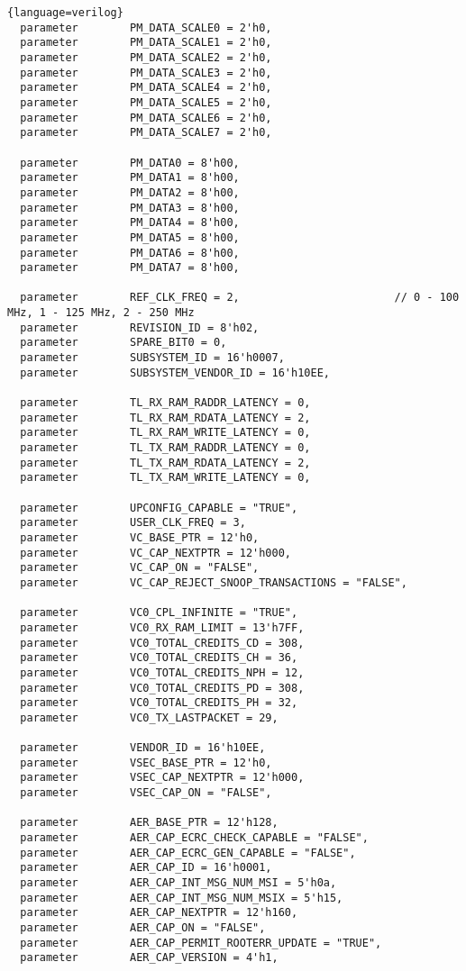\begin{lstlisting}{language=verilog}
  parameter        PM_DATA_SCALE0 = 2'h0,
  parameter        PM_DATA_SCALE1 = 2'h0,
  parameter        PM_DATA_SCALE2 = 2'h0,
  parameter        PM_DATA_SCALE3 = 2'h0,
  parameter        PM_DATA_SCALE4 = 2'h0,
  parameter        PM_DATA_SCALE5 = 2'h0,
  parameter        PM_DATA_SCALE6 = 2'h0,
  parameter        PM_DATA_SCALE7 = 2'h0,

  parameter        PM_DATA0 = 8'h00,
  parameter        PM_DATA1 = 8'h00,
  parameter        PM_DATA2 = 8'h00,
  parameter        PM_DATA3 = 8'h00,
  parameter        PM_DATA4 = 8'h00,
  parameter        PM_DATA5 = 8'h00,
  parameter        PM_DATA6 = 8'h00,
  parameter        PM_DATA7 = 8'h00,

  parameter        REF_CLK_FREQ = 2,                        // 0 - 100 MHz, 1 - 125 MHz, 2 - 250 MHz
  parameter        REVISION_ID = 8'h02,
  parameter        SPARE_BIT0 = 0,
  parameter        SUBSYSTEM_ID = 16'h0007,
  parameter        SUBSYSTEM_VENDOR_ID = 16'h10EE,

  parameter        TL_RX_RAM_RADDR_LATENCY = 0,
  parameter        TL_RX_RAM_RDATA_LATENCY = 2,
  parameter        TL_RX_RAM_WRITE_LATENCY = 0,
  parameter        TL_TX_RAM_RADDR_LATENCY = 0,
  parameter        TL_TX_RAM_RDATA_LATENCY = 2,
  parameter        TL_TX_RAM_WRITE_LATENCY = 0,

  parameter        UPCONFIG_CAPABLE = "TRUE",
  parameter        USER_CLK_FREQ = 3,
  parameter        VC_BASE_PTR = 12'h0,
  parameter        VC_CAP_NEXTPTR = 12'h000,
  parameter        VC_CAP_ON = "FALSE",
  parameter        VC_CAP_REJECT_SNOOP_TRANSACTIONS = "FALSE",

  parameter        VC0_CPL_INFINITE = "TRUE",
  parameter        VC0_RX_RAM_LIMIT = 13'h7FF,
  parameter        VC0_TOTAL_CREDITS_CD = 308,
  parameter        VC0_TOTAL_CREDITS_CH = 36,
  parameter        VC0_TOTAL_CREDITS_NPH = 12,
  parameter        VC0_TOTAL_CREDITS_PD = 308,
  parameter        VC0_TOTAL_CREDITS_PH = 32,
  parameter        VC0_TX_LASTPACKET = 29,

  parameter        VENDOR_ID = 16'h10EE,
  parameter        VSEC_BASE_PTR = 12'h0,
  parameter        VSEC_CAP_NEXTPTR = 12'h000,
  parameter        VSEC_CAP_ON = "FALSE",

  parameter        AER_BASE_PTR = 12'h128,
  parameter        AER_CAP_ECRC_CHECK_CAPABLE = "FALSE",
  parameter        AER_CAP_ECRC_GEN_CAPABLE = "FALSE",
  parameter        AER_CAP_ID = 16'h0001,
  parameter        AER_CAP_INT_MSG_NUM_MSI = 5'h0a,
  parameter        AER_CAP_INT_MSG_NUM_MSIX = 5'h15,
  parameter        AER_CAP_NEXTPTR = 12'h160,
  parameter        AER_CAP_ON = "FALSE",
  parameter        AER_CAP_PERMIT_ROOTERR_UPDATE = "TRUE",
  parameter        AER_CAP_VERSION = 4'h1,


\end{lstlisting}
